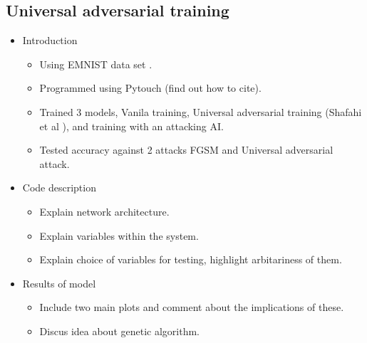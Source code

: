 \subsection{Universal adversarial training}

\begin{itemize}
	\item Introduction
	\begin{itemize}
		\item Using EMNIST data set \cite{EMNIST_data}.
		\item Programmed using Pytouch (find out how to cite).
		\item Trained 3 models, Vanila training, Universal adversarial training (Shafahi et al \cite{shafahi_universal_2018}), and training with an attacking AI.
		\item Tested accuracy against 2 attacks FGSM and Universal adversarial attack.
	\end{itemize}
	\item Code description
	\begin{itemize}
		\item Explain network architecture.
		\item Explain variables within the system.
		\item Explain choice of variables for testing, highlight arbitariness of them.
	\end{itemize}
	\item Results of model
	\begin{itemize}
		\item Include two main plots and comment about the implications of these.
		\item Discus idea about genetic algorithm.
	\end{itemize}
\end{itemize}